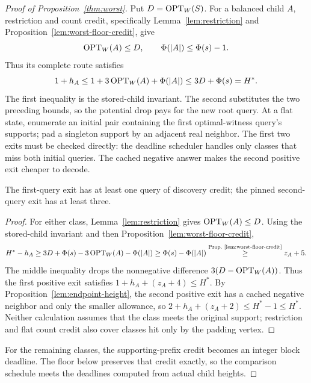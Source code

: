\begin{proof}[Proof of Proposition~\ref{thm:worst}]
Put $D=\operatorname{OPT}_W(S)$. For a balanced child $A$, restriction and
count credit, specifically Lemma~\ref{lem:restriction} and
Proposition~\ref{lem:worst-floor-credit}, give
\[
 \operatorname{OPT}_W(A)\le D,\qquad \Phi(|A|)\le\Phi(s)-1.
\]
Thus its complete route satisfies
\[
 1+h_A\le1+3\operatorname{OPT}_W(A)+\Phi(|A|)
          \le3D+\Phi(s)=H^*.
\]
The first inequality is the stored-child invariant. The second
substitutes the two preceding bounds, so the potential drop pays
for the new root query.
At a flat state,
enumerate an initial pair containing the first optimal-witness query's
supports; pad a singleton support by an adjacent real neighbor.
The first two exits must be checked directly: the deadline scheduler
handles only classes that miss both initial queries. The cached
negative answer makes the second positive exit cheaper to decode.

\begin{claim}
\label{clm:fallback-initial-exits}
The first-query exit has at least one query of discovery credit;
the pinned second-query exit has at least three.
\end{claim}
\begin{proof}
For either class, Lemma~\ref{lem:restriction} gives
$\operatorname{OPT}_W(A)\le D$. Using the stored-child invariant and then
Proposition~\ref{lem:worst-floor-credit},
\[
 H^*-h_A\ge3D+\Phi(s)
                -3\OPT_W(A)-\Phi(|A|)
             \ge\Phi(s)-\Phi(|A|)
             \byref{Prop.}{lem:worst-floor-credit}{\ge}z_A+5.
\]
The middle inequality drops the nonnegative difference
$3(D-\operatorname{OPT}_W(A))$. Thus the first positive exit satisfies
$1+h_A+(z_A+4)\le H^*$. By Proposition~\ref{lem:endpoint-height},
the second positive exit has a cached negative neighbor and only
the smaller allowance, so
$2+h_A+(z_A+2)\le H^*-1\le H^*$.
Neither calculation assumes that the class meets the original support;
restriction and flat count credit also cover classes hit only by
the padding vertex.
\end{proof}
For the remaining classes, the supporting-prefix credit becomes an
integer block deadline. The floor below preserves that credit exactly,
so the comparison schedule meets the deadlines computed from actual
child heights.


\end{proof}
